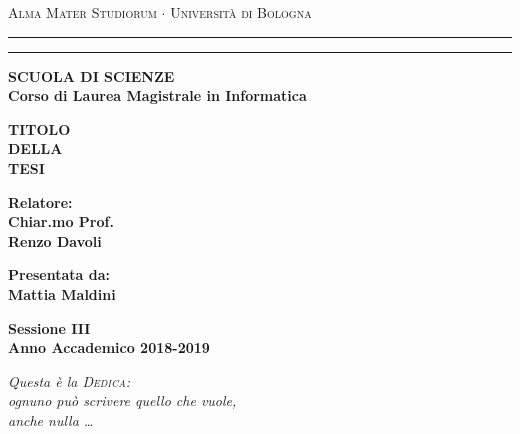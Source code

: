 \documentclass[12pt,a4paper,openright,twoside]{report}
\begin{document}
\begin{titlepage}

\begin{center}
{{\Large{\textsc{Alma Mater Studiorum $\cdot$ Universit\`a di
Bologna}}}} \rule[0.1cm]{15.8cm}{0.1mm}
\rule[0.5cm]{15.8cm}{0.6mm}
{\small{\bf SCUOLA DI SCIENZE\\
Corso di Laurea Magistrale in Informatica }}
\end{center}
\vspace{15mm}
\begin{center}
{\LARGE{\bf TITOLO}}\\
\vspace{3mm}
{\LARGE{\bf DELLA}}\\
\vspace{3mm}
{\LARGE{\bf TESI}}\\
\end{center}
\vspace{40mm}
\par
\noindent
\begin{minipage}[t]{0.47\textwidth}
{\large{\bf Relatore:\\
Chiar.mo Prof.\\
Renzo Davoli}}
\end{minipage}
\hfill
\begin{minipage}[t]{0.47\textwidth}\raggedleft
{\large{\bf Presentata da:\\
Mattia Maldini}}
\end{minipage}
\vspace{20mm}
\begin{center}
{\large{\bf Sessione III\\%
Anno Accademico 2018-2019}}%
\end{center}
%
\newpage                                %
\thispagestyle{empty}                   %
\topmargin=6.5cm                        %
\raggedleft                             %
\large                                  %
\em                                     %
Questa \`e la \textsc{Dedica}:\\
ognuno pu\`o scrivere quello che vuole, \\
anche nulla \ldots                      %
\newpage                                %



\clearpage{\pagestyle{empty}\cleardoublepage}%
\end{titlepage}
\end{document}
